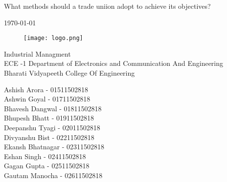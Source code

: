 \begin{titlepage}

\begin{center}

\Huge{What methods should a trade uniion adopt to achieve its objectives?}
\vspace{10mm}

\normalsize{\today}


\vspace{10mm}


\begin{figure}[!h]
    \centering
    \texttt{[image: logo.png]}
\end{figure}

\vspace{5mm}

\small{Industrial Managment\\ ECE -1}
\vspace{5mm}
\small{Department of Electronics and Communication And Engineering\\ Bharati Vidyapeeth College Of Engineering\\ }


\begin{multicols}{2}
\small{Ashish Arora - 01511502818} \\
\small{Ashwin Goyal - 01711502818} \\
\small{Bhavesh Dangwal - 01811502818} \\
\small{Bhupesh Bhatt - 01911502818} \\
\small{Deepanshu Tyagi - 02011502818} \\
\small{Divyanshu Bist - 02211502818} \\
\small{Ekansh Bhatnagar - 02311502818} \\
\small{Eshan Singh - 02411502818} \\
\small{Gagan Gupta - 02511502818} \\
\small{Gautam Manocha - 02611502818} \\
\end{multicols}

\end{center}

\end{titlepage}
